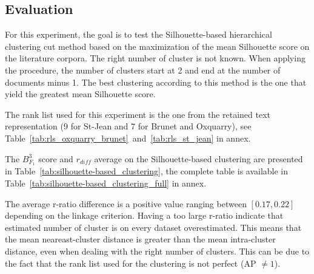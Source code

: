 \subsection{Evaluation}

For this experiment, the goal is to test the Silhouette-based hierarchical clustering cut method based on the maximization of the mean Silhouette score on the literature corpora.
The right number of cluster is not known.
When applying the procedure, the number of clusters start at 2 and end at the number of documents minus 1.
The best clustering according to this method is the one that yield the greatest mean Silhouette score.

The rank list used for this experiment is the one from the retained text representation (9 for St-Jean and 7 for Brunet and Oxquarry), see Table~\ref{tab:rls_oxquarry_brunet}~and~\ref{tab:rls_st_jean} in annex.

The $B^3_{F_1}$ score and $r_{diff}$ average on the Silhouette-based clustering are presented in Table~\ref{tab:silhouette-based_clustering}, the complete table is available in Table~\ref{tab:silhouette-based_clustering_full} in annex.

The average r-ratio difference is a positive value ranging between $\left[0.17, 0.22\right]$ depending on the linkage criterion.
Having a too large r-ratio indicate that estimated number of cluster is on every dataset overestimated.
This means that the mean neareast-cluster distance is greater than the mean intra-cluster distance, even when dealing with the right number of clusters.
This can be due to the fact that the rank list used for the clustering is not perfect (AP $\neq 1$).

\begin{table}
  \centering
  \caption{Silhouette-based clustering evaluation on retained rank lists, average $B^3_{F_1}$/$r_{diff}$, Maximal Silhouette ($\alpha = 0$)}
  \label{tab:silhouette-based_clustering}

\end{table}

